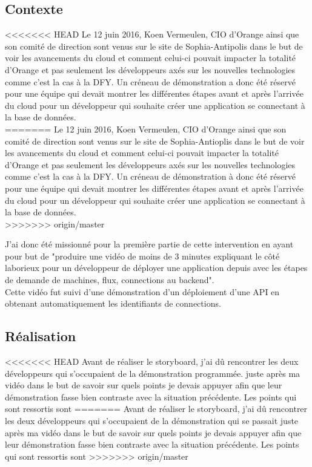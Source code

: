 \subsection{Contexte}
<<<<<<< HEAD
Le 12 juin 2016, Koen Vermeulen, CIO d'Orange ainsi que son comité de direction sont venus sur le site de Sophia-Antipolis dans le but de voir les avancements du cloud et comment celui-ci pouvait impacter la totalité d'Orange et pas seulement les développeurs axés sur les nouvelles technologies comme c'est la cas à la DFY. Un créneau de démonstration a donc été réservé pour une équipe qui devait montrer les différentes étapes avant et après l'arrivée du cloud pour un développeur qui souhaite créer une application se connectant à la base de données.\\
=======
Le 12 juin 2016, Koen Vermeulen, CIO d'Orange ainsi que son comité de direction sont venus sur le site de Sophia-Antioplis dans le but de voir les avancements du cloud et comment celui-ci pouvait impacter la totalité d'Orange et pas seulement les développeurs axés sur les nouvelles technologies comme c'est la cas à la DFY. Un créneau de démonstration à donc été réservé pour une équipe qui devait montrer les différentes étapes avant et après l'arrivée du cloud pour un développeur qui souhaite créer une application se connectant à la base de données.\\
>>>>>>> origin/master

J'ai donc été missionné pour la première partie de cette intervention en ayant pour but de "produire une vidéo de moins de 3 minutes expliquant le côté laborieux pour un développeur de déployer une application depuis avec les étapes de demande de machines, flux, connections au backend".\\

Cette vidéo fut suivi d'une démonstration d'un déploiement d'une API en obtenant automatiquement les identifiants de connections.

\subsection{Réalisation}
<<<<<<< HEAD
Avant de réaliser le storyboard, j'ai dû rencontrer les deux développeurs qui s'occupaient de la démonstration programmée. juste après ma vidéo dans le but de savoir sur quels points je devais appuyer afin que leur démonstration fasse bien contraste avec la situation précédente. Les points qui sont ressortis sont
=======
Avant de réaliser le storyboard, j'ai dû rencontrer les deux développeurs qui s'occupaient de la démonstration qui se passait juste après ma vidéo dans le but de savoir sur quels points je devais appuyer afin que leur démonstration fasse bien contraste avec la situation précédente. Les points qui sont ressortis sont
>>>>>>> origin/master

